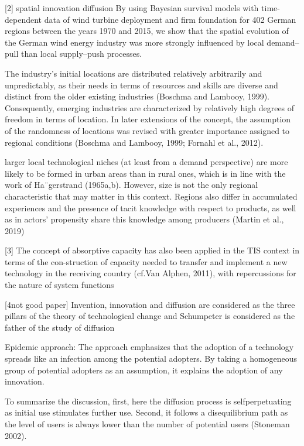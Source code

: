 \documentclass[10pt,letterpaper]{article}
\begin{document}
{[}2{]} spatial innovation diffusion By using Bayesian survival models
with time-dependent data of wind turbine deployment and firm foundation
for 402 German regions between the years 1970 and 2015, we show that the
spatial evolution of the German wind energy industry was more strongly
influenced by local demand-- pull than local supply--push processes.

The industry's initial locations are distributed relatively arbitrarily
and unpredictably, as their needs in terms of resources and skills are
diverse and distinct from the older existing industries (Boschma and
Lambooy, 1999). Consequently, emerging industries are characterized by
relatively high degrees of freedom in terms of location. In later
extensions of the concept, the assumption of the randomness of locations
was revised with greater importance assigned to regional conditions
(Boschma and Lambooy, 1999; Fornahl et al., 2012).

larger local technological niches (at least from a demand perspective)
are more likely to be formed in urban areas than in rural ones, which is
in line with the work of Ha¨gerstrand (1965a,b). However, size is not
the only regional characteristic that may matter in this context.
Regions also differ in accumulated experiences and the presence of tacit
knowledge with respect to products, as well as in actors' propensity
share this knowledge among producers (Martin et al., 2019)

{[}3{]} The concept of absorptive capacity has also been applied in the
TIS context in terms of the con-struction of capacity needed to transfer
and implement a new technology in the receiving country (cf.Van Alphen,
2011), with repercussions for the nature of system functions

{[}4not good paper{]} Invention, innovation and diffusion are considered
as the three pillars of the theory of technological change and
Schumpeter is considered as the father of the study of diffusion

Epidemic approach: The approach emphasizes that the adoption of a
technology spreads like an infection among the potential adopters. By
taking a homogeneous group of potential adopters as an assumption, it
explains the adoption of any innovation.

To summarize the discussion, first, here the diffusion process is
selfperpetuating as initial use stimulates further use. Second, it
follows a disequilibrium path as the level of users is always lower than
the number of potential users (Stoneman 2002).
\end{document}
